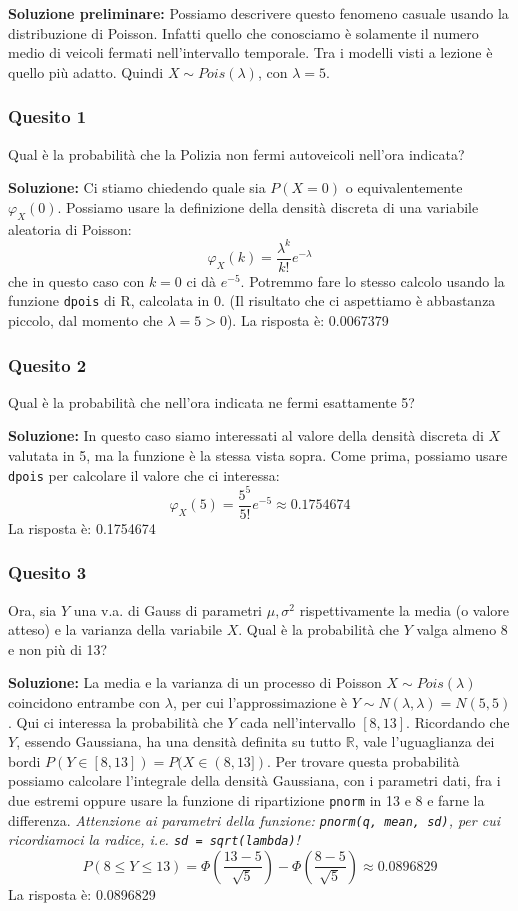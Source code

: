 \documentclass[12pt, a4paper]{article}
\begin{document}
\vspace{0.3cm}
\textbf{Soluzione preliminare:} Possiamo descrivere questo fenomeno casuale usando la distribuzione di Poisson. Infatti quello che conosciamo è solamente il numero medio di veicoli fermati nell'intervallo temporale. Tra i modelli visti a lezione è quello più adatto. Quindi $X \sim Pois(\lambda)$, con $\lambda=5$.

\subsubsection*{Quesito 1}
Qual è la probabilità che la Polizia non fermi autoveicoli nell’ora indicata?

\textbf{Soluzione:}
Ci stiamo chiedendo quale sia $P(X=0)$ o equivalentemente $\varphi_X(0)$. Possiamo usare la definizione della densità discreta di una variabile aleatoria di Poisson:
$$ \varphi_X(k) = \frac{\lambda^k}{k!} e^{-\lambda} $$
che in questo caso con $k=0$ ci dà $e^{-5}$. Potremmo fare lo stesso calcolo usando la funzione \texttt{dpois} di R, calcolata in 0. (Il risultato che ci aspettiamo è abbastanza piccolo, dal momento che $\lambda=5>0$).
La risposta è: 0.0067379

\subsubsection*{Quesito 2}
Qual è la probabilità che nell’ora indicata ne fermi esattamente 5?

\textbf{Soluzione:}
In questo caso siamo interessati al valore della densità discreta di $X$ valutata in 5, ma la funzione è la stessa vista sopra. Come prima, possiamo usare \texttt{dpois} per calcolare il valore che ci interessa:
$$ \varphi_X(5) = \frac{5^5}{5!} e^{-5} \approx 0.1754674 $$
La risposta è: 0.1754674

\subsubsection*{Quesito 3}
Ora, sia $Y$ una v.a. di Gauss di parametri $\mu, \sigma^2$ rispettivamente la media (o valore atteso) e la varianza della variabile $X$. Qual è la probabilità che $Y$ valga almeno 8 e non più di 13?

\textbf{Soluzione:}
La media e la varianza di un processo di Poisson $X \sim Pois(\lambda)$ coincidono entrambe con $\lambda$, per cui l'approssimazione è $Y \sim N(\lambda,\lambda) = N(5, 5)$.
Qui ci interessa la probabilità che $Y$ cada nell’intervallo $[8,13]$. Ricordando che $Y$, essendo Gaussiana, ha una densità definita su tutto $\mathbb{R}$, vale l'uguaglianza dei bordi $P(Y \in [8,13]) = P(X \in (8,13])$.
Per trovare questa probabilità possiamo calcolare l’integrale della densità Gaussiana, con i parametri dati, fra i due estremi oppure usare la funzione di ripartizione \texttt{pnorm} in 13 e 8 e farne la differenza.
\textit{Attenzione ai parametri della funzione: \texttt{pnorm(q, mean, sd)}, per cui ricordiamoci la radice, i.e. \texttt{sd = sqrt(lambda)}!}
$$ P(8 \leq Y \leq 13) = \Phi\left(\frac{13-5}{\sqrt{5}}\right) - \Phi\left(\frac{8-5}{\sqrt{5}}\right) \approx 0.0896829 $$
La risposta è: 0.0896829
\end{document}

